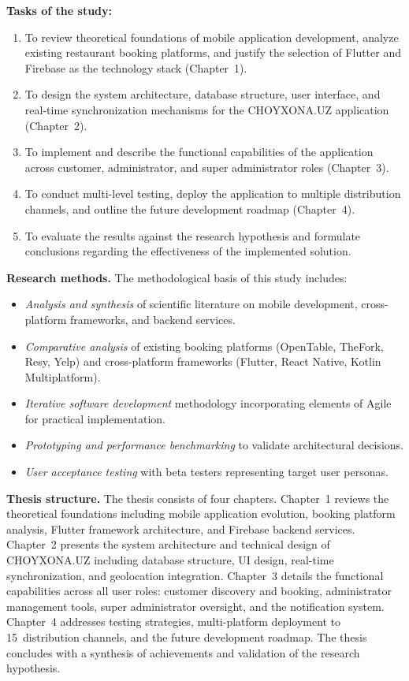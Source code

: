 \textbf{Tasks of the study:}
\begin{enumerate}
  \item To review theoretical foundations of mobile application development, analyze existing restaurant booking platforms, and justify the selection of Flutter and Firebase as the technology stack (Chapter~1).
  \item To design the system architecture, database structure, user interface, and real-time synchronization mechanisms for the CHOYXONA.UZ application (Chapter~2).
  \item To implement and describe the functional capabilities of the application across customer, administrator, and super administrator roles (Chapter~3).
  \item To conduct multi-level testing, deploy the application to multiple distribution channels, and outline the future development roadmap (Chapter~4).
  \item To evaluate the results against the research hypothesis and formulate conclusions regarding the effectiveness of the implemented solution.
\end{enumerate}

\textbf{Research methods.}
The methodological basis of this study includes:
\begin{itemize}
  \item \textit{Analysis and synthesis} of scientific literature on mobile development, cross-platform frameworks, and backend services.
  \item \textit{Comparative analysis} of existing booking platforms (OpenTable, TheFork, Resy, Yelp) and cross-platform frameworks (Flutter, React Native, Kotlin Multiplatform).
  \item \textit{Iterative software development} methodology incorporating elements of Agile for practical implementation.
  \item \textit{Prototyping and performance benchmarking} to validate architectural decisions.
  \item \textit{User acceptance testing} with beta testers representing target user personas.
\end{itemize}

\textbf{Thesis structure.}
The thesis consists of four chapters.
Chapter~1 reviews the theoretical foundations including mobile application evolution, booking platform analysis, Flutter framework architecture, and Firebase backend services.
Chapter~2 presents the system architecture and technical design of CHOYXONA.UZ including database structure, UI design, real-time synchronization, and geolocation integration.
Chapter~3 details the functional capabilities across all user roles: customer discovery and booking, administrator management tools, super administrator oversight, and the notification system.
Chapter~4 addresses testing strategies, multi-platform deployment to 15~distribution channels, and the future development roadmap.
The thesis concludes with a synthesis of achievements and validation of the research hypothesis.

